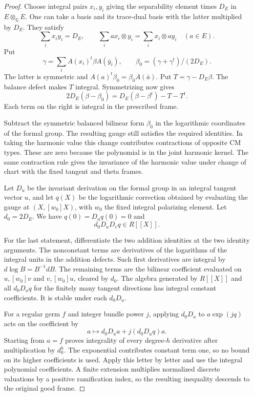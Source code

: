 \begin{proof}
Choose integral pairs \(x_i,y_i\) giving the separability
element times \(D_E\) in \(E\otimes_{\mathbb Q}E\).
One can take a basis and its trace-dual basis with
the latter multiplied by \(D_E\). They satisfy
\[
 \sum_i x_iy_i=D_E,\qquad \sum_i ax_i\otimes y_i=\sum_i x_i\otimes ay_i\quad(a\in E).
\]
Put
\[
  \gamma=\sum_i A(x_i)^t\beta A(\bar y_i),\qquad
  \beta_0=(\gamma+\gamma^t)/(2D_E).
\]
The latter is symmetric and \(A(a)^t\beta_0=\beta_0 A(\bar a)\).
Put \(T=\gamma-D_E\beta\). The balance defect makes \(T\) integral.
Symmetrizing now gives
\[
 2D_E(\beta-\beta_0)=D_E(\beta-\beta^t)-T-T^t .
\]
Each term on the right is integral in the prescribed frame.

Subtract the symmetric balanced bilinear form \(\beta_0\)
in the logarithmic coordinates of the formal group.
The resulting gauge still satisfies the required identities.
In taking the harmonic value this change contributes
contractions of opposite CM types. These are zero
because the polynomial is in the joint harmonic kernel.
The same contraction rule gives the invariance of the
harmonic value under change of chart with the fixed
tangent and theta frames.

Let \(D_u\) be the invariant derivation on the formal group
in an integral tangent vector \(u\), and let \(q(X)\)
be the logarithmic correction obtained by evaluating the
gauge at \((X,[w_0]X)\), with \(w_0\) the fixed integral
polarizing element. Let \(d_0=2D_E\). We have
\(q(0)=D_uq(0)=0\) and
\[
 d_0 D_uD_v q\in R[[X]].
\]

For the last statement, differentiate the two addition
identities at the two identity arguments. The
nonconstant terms are derivatives of the logarithms of
the integral units in the addition defects. Such first
derivatives are integral by \(d\log B=B^{-1}dB\).
The remaining terms are the bilinear coefficient
evaluated on \(u,[w_0]v\) and \(v,[w_0]u\), cleared by \(d_0\).
The algebra generated by \(R[[X]]\) and all
\(d_0D_uq\) for the finitely many tangent directions
has integral constant coefficients. It is stable under
each \(d_0D_u\).

For a regular germ \(f\) and integer
bundle power \(j\), applying \(d_0D_u\) to
\(a\exp(jq)\) acts on the coefficient by
\[
  a\longmapsto d_0D_ua+j(d_0D_uq)a .
\]
Starting from \(a=f\) proves integrality of every
degree-\(h\) derivative after multiplication by \(d_0^h\).
The exponential contributes constant term one, so
no bound on its higher coefficients is used. Apply this
letter by letter and use the integral polynomial
coefficients. A finite extension multiplies normalized
discrete valuations by a positive ramification index,
so the resulting inequality descends to the original
good frame.
\end{proof}

